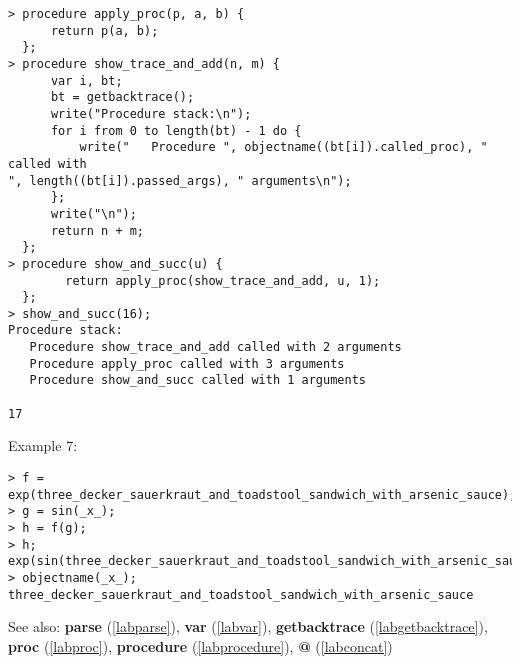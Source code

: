 \begin{center}\begin{minipage}{15cm}\begin{Verbatim}[frame=single]
> procedure apply_proc(p, a, b) {
      return p(a, b);
  };
> procedure show_trace_and_add(n, m) {
      var i, bt;
      bt = getbacktrace();
      write("Procedure stack:\n");
      for i from 0 to length(bt) - 1 do {
          write("   Procedure ", objectname((bt[i]).called_proc), " called with 
", length((bt[i]).passed_args), " arguments\n");
      };
      write("\n");
      return n + m;
  };
> procedure show_and_succ(u) {
        return apply_proc(show_trace_and_add, u, 1);
  };
> show_and_succ(16);
Procedure stack:
   Procedure show_trace_and_add called with 2 arguments
   Procedure apply_proc called with 3 arguments
   Procedure show_and_succ called with 1 arguments

17
\end{Verbatim}
\end{minipage}\end{center}
\noindent Example 7: 
\begin{center}\begin{minipage}{15cm}\begin{Verbatim}[frame=single]
> f = exp(three_decker_sauerkraut_and_toadstool_sandwich_with_arsenic_sauce);
> g = sin(_x_);
> h = f(g);
> h;
exp(sin(three_decker_sauerkraut_and_toadstool_sandwich_with_arsenic_sauce))
> objectname(_x_);
three_decker_sauerkraut_and_toadstool_sandwich_with_arsenic_sauce
\end{Verbatim}
\end{minipage}\end{center}
See also: \textbf{parse} (\ref{labparse}), \textbf{var} (\ref{labvar}), \textbf{getbacktrace} (\ref{labgetbacktrace}), \textbf{proc} (\ref{labproc}), \textbf{procedure} (\ref{labprocedure}), \textbf{@} (\ref{labconcat})
